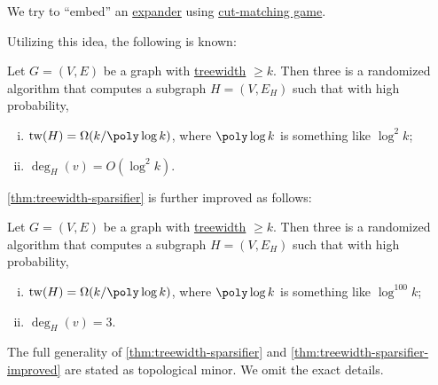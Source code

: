 \begin{intuition}
	We try to ``embed'' an \hyperref[def:expander]{expander} using \hyperref[def:cut-matching-game]{cut-matching game}.
\end{intuition}

Utilizing this idea, the following is known:

\begin{theorem}\label{thm:treewidth-sparsifier}
	Let \(G = (V, E)\) be a graph with \hyperref[def:treewidth]{treewidth} \(\geq k\). Then three is a randomized algorithm that computes a subgraph \(H = (V, E_H)\) such that with high probability,
	\begin{enumerate}[(i)]
		\item \(\operatorname{tw}(H) = \Omega (k / \poly \log k)\), where \(\poly \log k\) is something like \(\log ^2 k\);
		\item \(\deg_H(v) = O(\log ^2 k)\).
	\end{enumerate}
\end{theorem}

\autoref{thm:treewidth-sparsifier} is further improved as follows:

\begin{theorem}\label{thm:treewidth-sparsifier-improved}
	Let \(G = (V, E)\) be a graph with \hyperref[def:treewidth]{treewidth} \(\geq k\). Then three is a randomized algorithm that computes a subgraph \(H = (V, E_H)\) such that with high probability,
	\begin{enumerate}[(i)]
		\item \(\operatorname{tw}(H) = \Omega (k / \poly \log k)\), where \(\poly \log k\) is something like \(\log ^{100} k\);
		\item \(\deg_H(v) = 3\).
	\end{enumerate}
\end{theorem}

\begin{remark}
	The full generality of \autoref{thm:treewidth-sparsifier} and \autoref{thm:treewidth-sparsifier-improved} are stated as topological minor. We omit the exact details.
\end{remark}

